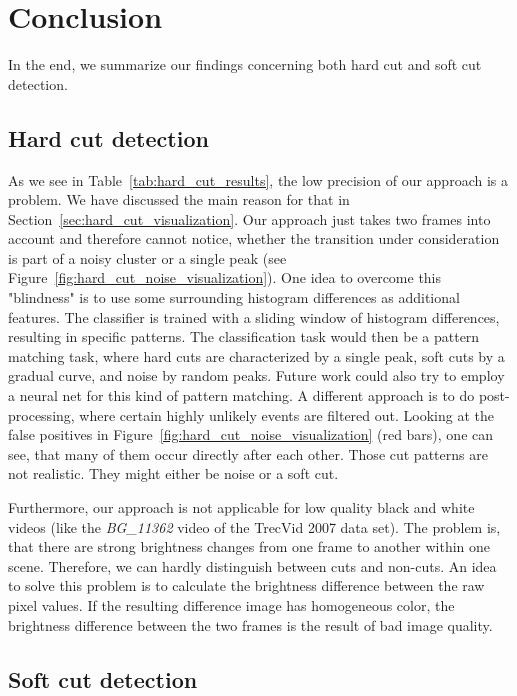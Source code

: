 \section{Conclusion}
\label{sec:conclusion}
In the end, we summarize our findings concerning both hard cut and soft cut detection.

\subsection{Hard cut detection}
\label{sec:conclusion_hard_cut}

As we see in Table~\ref{tab:hard_cut_results}, the low precision of our approach is a problem.
We have discussed the main reason for that in Section~\ref{sec:hard_cut_visualization}.
Our approach just takes two frames into account and therefore cannot notice, whether the transition under consideration is part of a noisy cluster or a single peak (see Figure~\ref{fig:hard_cut_noise_visualization}).
One idea to overcome this "blindness" is to use some surrounding histogram differences as additional features.
The classifier is trained with a sliding window of histogram differences, resulting in specific patterns.
The classification task would then be a pattern matching task, where hard cuts are characterized by a single peak, soft cuts by a gradual curve, and noise by random peaks.
Future work could also try to employ a neural net for this kind of pattern matching.
A different approach is to do post-processing, where certain highly unlikely events are filtered out.
Looking at the false positives in Figure~\ref{fig:hard_cut_noise_visualization} (red bars), one can see, that many of them occur directly after each other.
Those cut patterns are not realistic.
They might either be noise or a soft cut.

Furthermore, our approach is not applicable for low quality black and white videos (like the \emph{BG\_11362} video of the TrecVid 2007 data set).
The problem is, that there are strong brightness changes from one frame to another within one scene.
Therefore, we can hardly distinguish between cuts and non-cuts.
An idea to solve this problem is to calculate the brightness difference between the raw pixel values.
If the resulting difference image has homogeneous color, the brightness difference between the two frames is the result of bad image quality.


\subsection{Soft cut detection}
\label{sec:conclusion_hard_cut}

